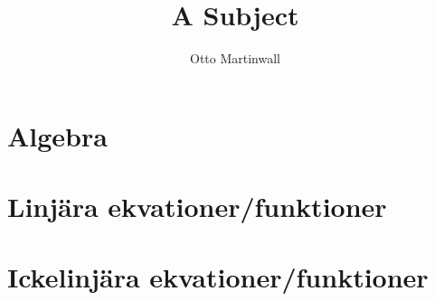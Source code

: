 
\usepackage[swedish]{babel}

\title{A Subject}
\author{Otto Martinwall}


\maketitle
\tableofcontents
\newpage

\newtheorem{definition}{Definition}
\newtheorem{theorem}{Theorem}

\section{Algebra}


\section{Linjära ekvationer/funktioner}


\section{Ickelinjära ekvationer/funktioner}


